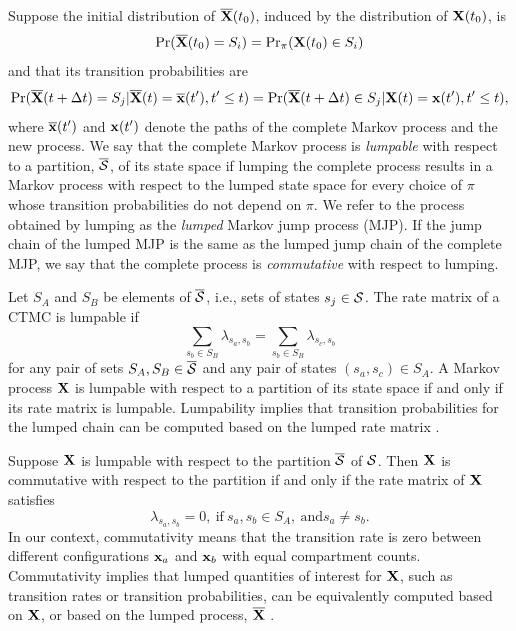 Suppose the initial distribution of $ \overline{\mathbf{X}}(t_0) $, induced by the distribution of $ \mathbf{X}(t_0) $, is \begin{equation*}
\Pr(\overline{\mathbf{X}}(t_0) = S_i) = \mathrm{Pr}_\pi(\mathbf{X}(t_0) \in S_i)
\end{equation*}
and that its transition probabilities are
\begin{equation*}
\Pr(\overline{\mathbf{X}}(t+\Delta t) = S_j | \overline{\mathbf{X}}(t)=\overline{\mathbf{x}}(t^\prime), t^\prime \leq t) = \Pr(\overline{\mathbf{X}}(t+\Delta t) \in S_j | \mathbf{X}(t)=\mathbf{x}(t^\prime), t^\prime \leq t),
\end{equation*}
where $ \overline{\mathbf{x}}(t^\prime) $  and $ \mathbf{x}(t^\prime) $ denote the paths of the complete Markov process and the new process. We say that the complete Markov process is \textit{lumpable} with respect to a partition, $ \overline{\mathcal{S}} $, of its state space if lumping the complete process results in a Markov process with respect to the lumped state space for every choice of $ \pi $ whose transition probabilities do not depend on $ \pi $. We refer to the process obtained by lumping as the \textit{lumped} Markov jump process (MJP). If the jump chain of the lumped MJP is the same as the lumped jump chain of the complete MJP, we say that the complete process is \textit{commutative} with respect to lumping.  

Let $ S_A $ and $ S_B $ be elements of $ \overline{\mathcal{S}} $, i.e., sets of states $ s_j \in \mathcal{S} $. The rate matrix of a CTMC is lumpable if
\begin{equation*}
\sum_{s_b \in S_B}\lambda_{s_a,s_b} = \sum_{s_b \in S_B}\lambda_{s_c,s_b}
\end{equation*}
for any pair of sets $S_A,S_B \in \overline{\mathcal{S}} $ and any pair of states  $(s_a, s_c) \in S_A$. A Markov process $ \mathbf{X} $ is lumpable with respect to a partition of its state space if and only if its rate matrix is lumpable. Lumpability implies that transition probabilities for the lumped chain can be computed based on the lumped rate matrix  \cite{tian2006lumpability}.

Suppose $ \mathbf{X} $ is lumpable with respect to the partition $ \overline{\mathcal{S}} $ of $ \mathcal{S} $. Then $ \mathbf{X} $ is commutative with respect to the partition if and only if the rate matrix of $ \mathbf{X} $ satisfies
$$\lambda_{s_a,s_b} = 0,\ \text{if}\ s_a,s_b\in S_A,\ \text{and} s_a\neq s_b. $$ In our context, commutativity means that the transition rate is zero between different configurations $ \mathbf{x}_a $ and $ \mathbf{x}_b $ with equal compartment counts. Commutativity implies that lumped quantities of interest for $ \mathbf{X} $, such as transition rates or transition probabilities, can be equivalently computed based on $ \mathbf{X} $, or based on the lumped process, $ \overline{\mathbf{X}} $ \cite{tian2006lumpability}. 

